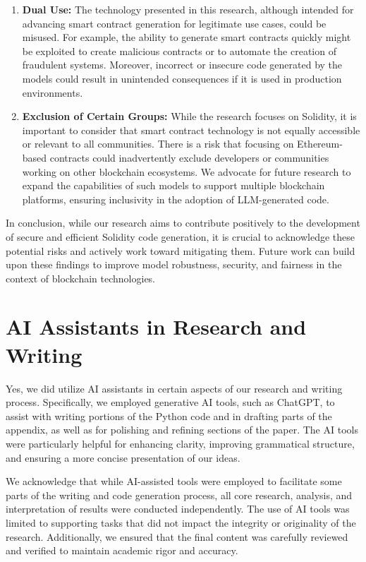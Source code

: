 \begin{enumerate}[leftmargin=*]
    \item \textbf{Dual Use:} 
    The technology presented in this research, although intended for advancing smart contract generation for legitimate use cases, could be misused. For example, the ability to generate smart contracts quickly might be exploited to create malicious contracts or to automate the creation of fraudulent systems. Moreover, incorrect or insecure code generated by the models could result in unintended consequences if it is used in production environments.
    
    \item \textbf{Exclusion of Certain Groups:} 
    While the research focuses on Solidity, it is important to consider that smart contract technology is not equally accessible or relevant to all communities. There is a risk that focusing on Ethereum-based contracts could inadvertently exclude developers or communities working on other blockchain ecosystems. We advocate for future research to expand the capabilities of such models to support multiple blockchain platforms, ensuring inclusivity in the adoption of LLM-generated code.
\end{enumerate}

In conclusion, while our research aims to contribute positively to the development of secure and efficient Solidity code generation, it is crucial to acknowledge these potential risks and actively work toward mitigating them. Future work can build upon these findings to improve model robustness, security, and fairness in the context of blockchain technologies.


\section{AI Assistants in Research and Writing}

Yes, we did utilize AI assistants in certain aspects of our research and writing process. Specifically, we employed generative AI tools, such as ChatGPT, to assist with writing portions of the Python code and in drafting parts of the appendix, as well as for polishing and refining sections of the paper. The AI tools were particularly helpful for enhancing clarity, improving grammatical structure, and ensuring a more concise presentation of our ideas.

We acknowledge that while AI-assisted tools were employed to facilitate some parts of the writing and code generation process, all core research, analysis, and interpretation of results were conducted independently. The use of AI tools was limited to supporting tasks that did not impact the integrity or originality of the research. Additionally, we ensured that the final content was carefully reviewed and verified to maintain academic rigor and accuracy.


